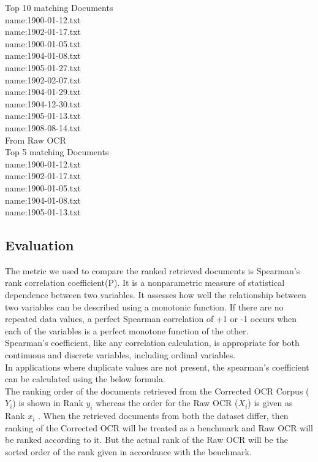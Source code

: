 \documentclass[10pt, conference, compsocconf]{IEEEtran}
\begin{document}
Top 10 matching Documents \\
name:1900-01-12.txt \\
name:1902-01-17.txt \\
name:1900-01-05.txt \\
name:1904-01-08.txt \\
name:1905-01-27.txt \\
name:1902-02-07.txt \\
name:1904-01-29.txt \\
name:1904-12-30.txt \\
name:1905-01-13.txt \\
name:1908-08-14.txt \\

From Raw OCR \\

Top 5 matching Documents \\
name:1900-01-12.txt \\
name:1902-01-17.txt \\
name:1900-01-05.txt \\ 
name:1904-01-08.txt \\
name:1905-01-13.txt \\



\subsection{Evaluation}
The metric we used to compare the ranked retrieved documents is Spearman's rank correlation coefficient(P). It is a nonparametric measure of statistical dependence between two variables. It assesses how well the relationship between two variables can be described using a monotonic function. If there are no repeated data values, a perfect Spearman correlation of +1 or -1 occurs when each of the variables is a perfect monotone function of the other.\\
Spearman's coefficient, like any correlation calculation, is appropriate for both continuous and discrete variables, including ordinal variables.\\
In applications where duplicate values are not present, the spearman's coefficient can be calculated using the below formula.\\
The ranking order of the documents retrieved from the Corrected OCR Corpus ($Y_{i}$) is shown in Rank $y_{i}$ whereas the order for the Raw OCR ($X_{i}$) is given as Rank $x_{i}$ . When the retrieved documents from both the dataset differ, then ranking of the Corrected OCR will be treated as a benchmark and Raw OCR will be ranked according to it. But the actual rank of the Raw OCR will be the sorted order of the rank given in accordance with the benchmark. \\
\end{document}
